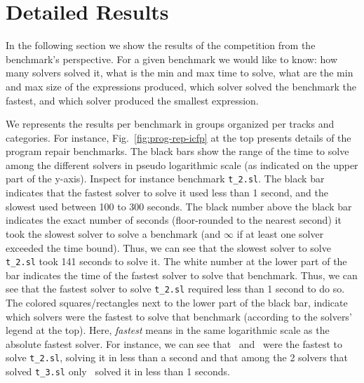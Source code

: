 \section{Detailed Results}
\label{sec:benchs-pres}

In the following section we show the results of the competition from the benchmark's perspective. 
For a given benchmark we would like to know: how many solvers solved it, what is the min and max time to solve,  what are the min and max size of the expressions produced, which solver solved the benchmark the fastest, and which solver produced the smallest expression.



We represents the results per benchmark in groups organized per tracks and categories. For instance, Fig.~\ref{fig:prog-rep-icfp} at the top presents details of the program repair benchmarks. The black bars show the range of the time to solve among the different solvers in pseudo logarithmic scale (as indicated on the upper part of the y-axis). Inspect for instance benchmark \texttt{t\_2.sl}. The black bar indicates that the fastest solver to solve it used less than 1 second, and the slowest used between 100 to 300 seconds. 
The black number above the black bar indicates the exact number of seconds (floor-rounded to the nearest second) it took the slowest solver to solve a benchmark (and $\infty$ if at least one solver exceeded the time bound). Thus, we can see that the slowest solver to solve \texttt{t\_2.sl} took 141 seconds to solve it. The white number at the lower part of the bar indicates the time of the fastest solver to solve that benchmark. Thus, we can see that the fastest solver to solve \texttt{t\_2.sl} required less than 1 second to do so. The colored squares/rectangles next to the lower part of the black bar, indicate which solvers were the fastest to solve that benchmark (according to the solvers' legend at the top). Here, \emph{fastest} means in the same logarithmic scale as the absolute fastest solver. For instance, we can see that \euphony\ and \eusolvernew\ were the fastest to solve \texttt{t\_2.sl}, solving it in less than a second
and that among the 2 solvers that solved \texttt{t\_3.sl} only \eusolvernew\ solved it in less than 1 seconds. 

